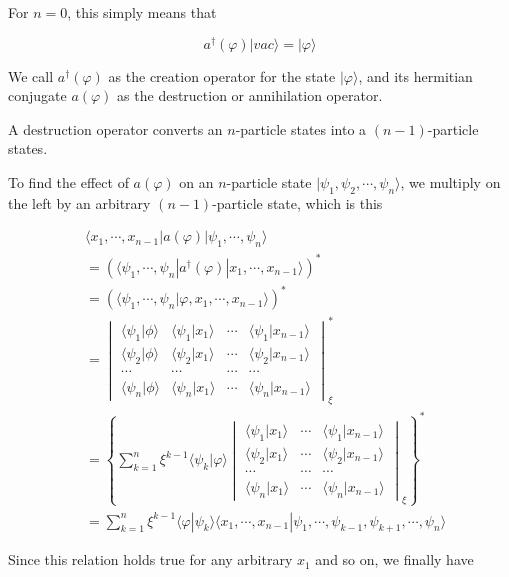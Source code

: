 For $n=0$, this simply means that

\[a^\dagger(\varphi)|vac\rangle = |\varphi\rangle \]

We call $a^\dagger(\varphi)$ as the creation operator for the state $|\varphi\rangle$, and its hermitian conjugate $a(\varphi)$ as the destruction or annihilation operator. 

A destruction operator converts an $n$-particle states into a $(n-1)$-particle states. 

To find the effect of $a(\varphi)$ on an $n$-particle state $|\psi_1,\psi_2,\cdots,\psi_n\rangle$, we multiply on the left by an arbitrary $(n-1)$-particle state, which is this

\[\begin{split}
&\langle x_1,\cdots,x_{n-1}|a(\varphi)|\psi_1,\cdots,\psi_n\rangle \\
&= (\langle \psi_1,\cdots,\psi_n|a^\dagger(\varphi)|x_1,\cdots,x_{n-1}\rangle)^*\\
&= (\langle \psi_1,\cdots,\psi_n|\varphi,x_1,\cdots,x_{n-1}\rangle)^*\\
&= 
\begin{vmatrix}
\langle\psi_1|\phi\rangle & \langle\psi_1|x_1\rangle & \cdots & \langle\psi_1|x_{n-1}\rangle\\
\langle\psi_2|\phi\rangle & \langle\psi_2|x_1\rangle & \cdots & \langle\psi_2|x_{n-1}\rangle\\
\cdots & \cdots & \cdots & \cdots \\
\langle\psi_n|\phi\rangle & \langle\psi_n|x_1\rangle & \cdots & \langle\psi_n|x_{n-1}\rangle
\end{vmatrix}_{\xi}^*\\
&= \left\{\sum_{k=1}^n \xi^{k-1}\langle\psi_k|\varphi\rangle
\begin{vmatrix}
 \langle\psi_1|x_1\rangle & \cdots & \langle\psi_1|x_{n-1}\rangle\\
 \langle\psi_2|x_1\rangle & \cdots & \langle\psi_2|x_{n-1}\rangle\\
 \cdots & \cdots & \cdots \\
 \langle\psi_n|x_1\rangle & \cdots & \langle\psi_n|x_{n-1}\rangle
\end{vmatrix}_{\xi} \right\}^*\\
&= \sum_{k=1}^n \xi^{k-1}\langle\varphi|\psi_k\rangle\langle x_1,\cdots,x_{n-1}|\psi_1,\cdots,\psi_{k-1},\psi_{k+1},\cdots,\psi_n\rangle
\end{split}\]

Since this relation holds true for any arbitrary $x_1$ and so on, we finally have

